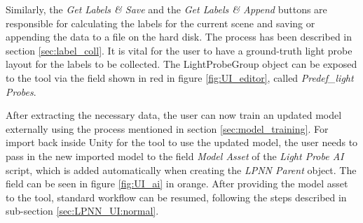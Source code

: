 Similarly, the \textit{Get Labels \& Save} and the \textit{Get Labels \& Append} buttons are responsible for calculating the labels for the current scene and saving or appending the data to a file on the hard disk. The process has been described in section \ref{sec:label_coll}. It is vital for the user to have a ground-truth light probe layout for the labels to be collected. The LightProbeGroup object can be exposed to the tool via the field shown in red in figure \ref{fig:UI_editor}, called \textit{Predef\_light Probes}.

After extracting the necessary data, the user can now train an updated model externally using the process mentioned in section \ref{sec:model_training}. For import back inside Unity for the tool to use the updated model, the user needs to pass in the new imported model to the field \textit{Model Asset} of the \textit{Light Probe AI} script, which is added automatically when creating the \textit{LPNN Parent} object. The field can be seen in figure \ref{fig:UI_ai} in orange. After providing the model asset to the tool, standard workflow can be resumed, following the steps described in sub-section \ref{sec:LPNN_UI:normal}.

